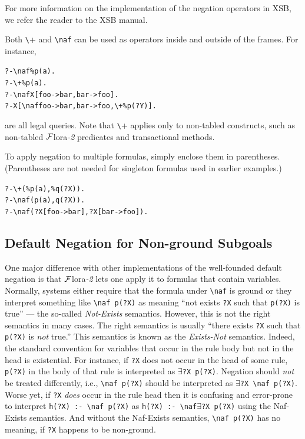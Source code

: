 \documentclass[11pt]{article}
\newcommand{\FLORA}{{\mbox{\sc ${\cal F}${lora}\rm\emph{-2}}}\xspace}
\newcommand{\FLSYSTEM}{\FLORA}
\newcommand{\bs}{\textbackslash}
\newcommand{\PLGNAF}{\mbox{\texttt{\bs}+}\xspace}
\newcommand{\RULELOGNAF}{{\texttt{{\bs}naf}}\xspace}
\begin{document}
For more information on the implementation of the negation operators in
XSB, we refer the reader to the XSB manual.

Both \PLGNAF and \RULELOGNAF can be used as operators inside and outside of
the frames. For instance,
\begin{alltt}
       ?- \RULELOGNAF \%p(a).
       ?- \PLGNAF \%p(a).
       ?- \RULELOGNAF X[foo->bar, bar->foo].
       ?- X[\RULELOGNAF foo->bar, bar->foo, \PLGNAF \%p(?Y)].
\end{alltt}
are all legal queries. Note that \PLGNAF applies only to non-tabled
constructs, such as non-tabled \FLSYSTEM predicates and transactional methods.

To apply negation to multiple formulas, simply enclose them in
parentheses. (Parentheses are not needed for singleton formulas used in
earlier examples.)
\begin{alltt}
       ?- \PLGNAF(\%p(a),\%q(?X)).
       ?- \RULELOGNAF(p(a),q(?X)).
       ?- \RULELOGNAF(?X[foo->bar], ?X[bar->foo]).
\end{alltt}

\subsection{Default Negation for Non-ground Subgoals}
\label{sec-nonground-naf}

One major difference with other implementations of the well-founded default
negation is that \FLSYSTEM lets one apply it to formulas that contain variables.
Normally, systems either require that the formula under \texttt{\RULELOGNAF} is
ground or they interpret something like \texttt{\RULELOGNAF p(?X)} as meaning ``not
exists \texttt{?X} such that \texttt{p(?X)} is true'' --- the so-called
\emph{Not-Exists} semantics.
However, this is not the right semantics in many cases. The right semantics
is usually ``there exists \texttt{?X} such that \texttt{p(?X)} is
\emph{not} true.'' This semantics is known as the \emph{Exists-Not} semantics.
Indeed, the standard convention for variables that occur in the rule body
but not in the head is existential. For instance, if \texttt{?X} does not
occur in the head of some rule, \texttt{p(?X)} in the body  of that rule
is interpreted as \texttt{$\exists$?X p(?X)}. Negation should \emph{not}  be treated
differently, i.e., \texttt{\RULELOGNAF p(?X)}   should be interpreted as
\texttt{$\exists$?X \RULELOGNAF p(?X)}. Worse yet, if \texttt{?X} \emph{does} occur in the
rule head then it is confusing and error-prone to interpret
\texttt{h(?X) :- \RULELOGNAF p(?X)} as  \texttt{h(?X) :- \RULELOGNAF $\exists$?X p(?X)} using the Naf-Exists
semantics. And without the Naf-Exists semantics, \texttt{\RULELOGNAF p(?X)}  has no
meaning, if \texttt{?X} happens to be non-ground.
\end{document}
